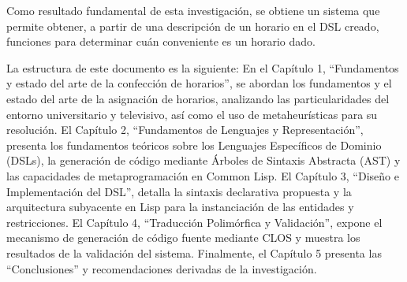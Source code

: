 \documentclass[12pt]{article}
\begin{document}
Como resultado fundamental de esta investigación, se obtiene un sistema que permite obtener, a partir de una descripción de un horario en el DSL creado, funciones para determinar cuán conveniente es un horario dado.

La estructura de este documento es la siguiente: En el Capítulo 1, ``Fundamentos y estado del arte de la confección de horarios'', se abordan los fundamentos y el estado del arte de la asignación de horarios, analizando las particularidades del entorno universitario y televisivo, así como el uso de metaheurísticas para su resolución. El Capítulo 2, ``Fundamentos de Lenguajes y Representación'', presenta los fundamentos teóricos sobre los Lenguajes Específicos de Dominio (DSLs), la generación de código mediante Árboles de Sintaxis Abstracta (AST) y las capacidades de metaprogramación en Common Lisp. El Capítulo 3, ``Diseño e Implementación del DSL'', detalla la sintaxis declarativa propuesta y la arquitectura subyacente en Lisp para la instanciación de las entidades y restricciones. El Capítulo 4, ``Traducción Polimórfica y Validación'', expone el mecanismo de generación de código fuente mediante CLOS y muestra los resultados de la validación del sistema. Finalmente, el Capítulo 5 presenta las ``Conclusiones'' y recomendaciones derivadas de la investigación.
\end{document}
